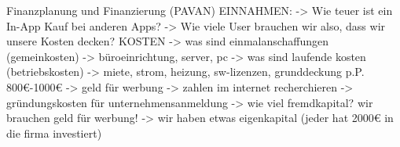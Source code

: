 Finanzplanung und Finanzierung (PAVAN)
    EINNAHMEN:
    -> Wie teuer ist ein In-App Kauf bei anderen Apps?
    -> Wie viele User brauchen wir also, dass wir unsere Kosten decken?    
    KOSTEN
    -> was sind einmalanschaffungen (gemeinkosten) -> büroeinrichtung, server, pc
    -> was sind laufende kosten (betriebskosten) -> miete, strom, heizung, sw-lizenzen, grunddeckung p.P. 800€-1000€
    -> geld für werbung -> zahlen im internet recherchieren
    -> gründungskosten für unternehmensanmeldung    
    -> wie viel fremdkapital? wir brauchen geld für werbung!
    -> wir haben etwas eigenkapital (jeder hat 2000€ in die firma investiert)






















